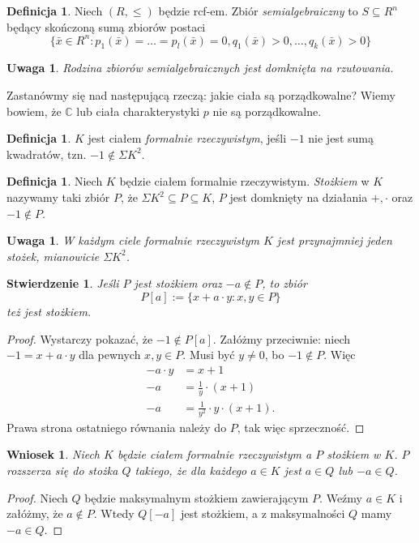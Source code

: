 \documentclass{article}
\newcommand{\C}{\mathbb{C}}
\theoremstyle{plain}
\newtheorem{stw}[thm]{Stwierdzenie}
\newtheorem{wn}[thm]{Wniosek}
\newtheorem{uw}[thm]{Uwaga}
\theoremstyle{definition}
\newtheorem{df}[thm]{Definicja}
\theoremstyle{remark}
\begin{document}
\begin{df}
	 Niech $ (R, \leq)$ będzie rcf-em.
	 Zbiór \textit{semialgebraiczny} to $ S \subseteq R^n$ będący skończoną sumą zbiorów postaci
	 \[
		 \{\bar{x} \in R^n \colon p_1(\bar{x}) = \ldots = p_l(\bar{x}) = 0, q_1(\bar{x}) > 0, \ldots, q_k(\bar{x}) > 0 \}
	 \]
\end{df}

\begin{uw}
	 Rodzina zbiorów semialgebraicznych jest domknięta na rzutowania.
\end{uw}


Zastanówmy się nad następującą rzeczą: jakie ciała są porządkowalne?
Wiemy bowiem, że $ \C$ lub ciała charakterystyki $ p$ nie są porządkowalne.

\begin{df}
	 $ K$ jest ciałem \textit{formalnie rzeczywistym}, jeśli $ -1$ nie jest sumą kwadratów, tzn. $ -1 \not \in \Sigma K^2$.
\end{df}
\begin{df}
         Niech $ K$ będzie ciałem formalnie rzeczywistym.
         \textit{Stożkiem} w $ K$ nazywamy taki zbiór $P$,
	 że $\Sigma K^2 \subseteq P \subseteq K$, $P$ jest domknięty na działania $+, \cdot$ oraz $-1 \not \in P$.
\end{df}

\begin{uw}
	W każdym ciele formalnie rzeczywistym $K$ jest przynajmniej jeden stożek, mianowicie $\Sigma K^2$.
\end{uw}
\begin{stw}
	Jeśli $P$ jest stożkiem oraz $-a \not \in P$, to zbiór $$P[a] := \{x + a \cdot y \colon x, y \in P\}$$ też jest stożkiem.
\end{stw}
\begin{proof}
	Wystarczy pokazać, że $-1 \not \in P[a]$.
	Załóżmy przeciwnie: niech $-1 = x + a \cdot y$ dla pewnych $x, y \in P$.
	Musi być $y \neq 0$, bo $-1 \not \in P$.
	Więc
	\begin{align*}
		-a \cdot y &= x + 1 \\
		-a &= \frac{1}{y} \cdot (x + 1) \\
		-a &= \frac{1}{y^2} \cdot y \cdot (x + 1).
	\end{align*}
	Prawa strona ostatniego równania należy do  $P$, tak więc sprzeczność.
\end{proof}
\begin{wn}
	 Niech $K$ będzie ciałem formalnie rzeczywistym a $P$ stożkiem w $K$.
	 $P$ rozszerza się do stożka $Q$ takiego, że dla każdego $a \in K$ jest $a \in Q$ lub $-a \in Q$.
\end{wn}
\begin{proof}
	 Niech $Q$ będzie maksymalnym stożkiem zawierającym $P$.
	 Weźmy $a \in K$ i załóżmy, że $a \not \in P$.
	 Wtedy $Q[-a]$ jest stożkiem, a z maksymalności $Q$ mamy $-a \in Q$.
\end{proof}
\end{document}
